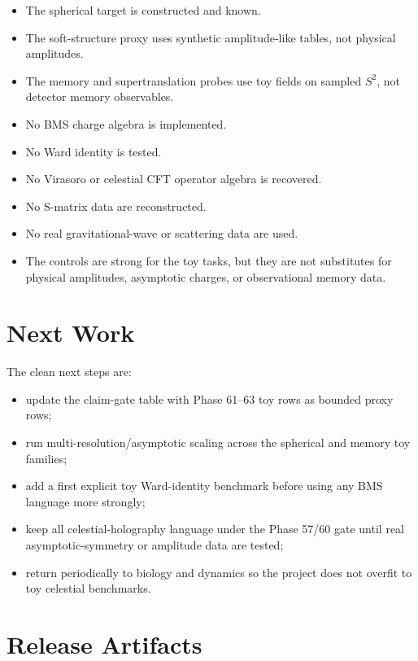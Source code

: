 \documentclass[11pt]{article}
\begin{document}
\begin{itemize}
\item The spherical target is constructed and known.
\item The soft-structure proxy uses synthetic amplitude-like tables, not physical amplitudes.
\item The memory and supertranslation probes use toy fields on sampled $S^2$, not detector memory observables.
\item No BMS charge algebra is implemented.
\item No Ward identity is tested.
\item No Virasoro or celestial CFT operator algebra is recovered.
\item No S-matrix data are reconstructed.
\item No real gravitational-wave or scattering data are used.
\item The controls are strong for the toy tasks, but they are not substitutes for physical amplitudes, asymptotic charges, or observational memory data.
\end{itemize}

\section{Next Work}

The clean next steps are:
\begin{itemize}
\item update the claim-gate table with Phase 61--63 toy rows as bounded proxy rows;
\item run multi-resolution/asymptotic scaling across the spherical and memory toy families;
\item add a first explicit toy Ward-identity benchmark before using any BMS language more strongly;
\item keep all celestial-holography language under the Phase 57/60 gate until real asymptotic-symmetry or amplitude data are tested;
\item return periodically to biology and dynamics so the project does not overfit to toy celestial benchmarks.
\end{itemize}

\section{Release Artifacts}
\end{document}
